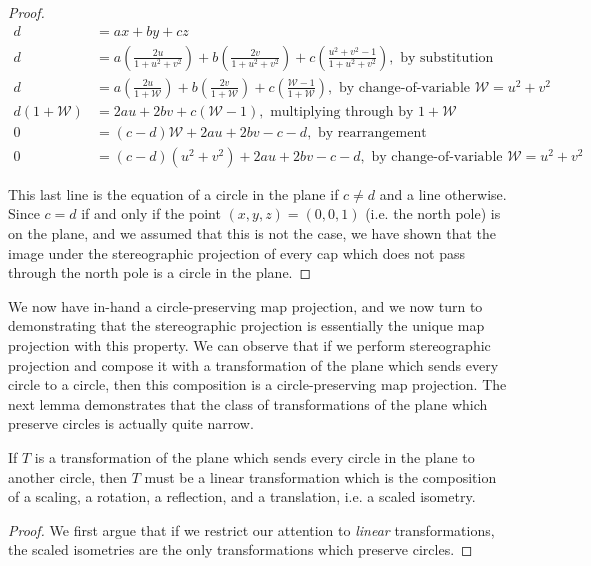 {\begin{proof}
\begin{align*}
    d&=ax+by+cz\\
    d&=a\left(\frac{2u}{1+u^2+v^2}\right)+b\left(\frac{2v}{1+u^2+v^2}\right)+c\left(\frac{u^2+v^2-1}{1+u^2+v^2}\right), \text{ by substitution}\\
    d&=a\left(\frac{2u}{1+\mathcal{W}}\right)+b\left(\frac{2v}{1+\mathcal{W}}\right)+c\left(\frac{\mathcal{W}-1}{1+\mathcal{W}}\right), \text{ by change-of-variable }\mathcal{W}=u^2+v^2\\
    d\left(1+\mathcal{W}\right)&=2au+2bv+c\left(\mathcal{W}-1\right), \text{ multiplying through by }1+\mathcal{W}\\
    0 &= (c-d)\mathcal{W} + 2au +2bv - c - d,\text{ by rearrangement}\\
    0 &= (c-d)(u^2+v^2)+2au+2bv - c - d,\text{ by change-of-variable } \mathcal{W}=u^2+v^2
\end{align*}

This last line is the equation of a circle in the plane if $c\neq d$ and a line otherwise.  Since $c=d$ if and only if the point $(x,y,z)=(0,0,1)$ (i.e. the north pole) is on the plane, and we assumed that this is not the case, we have shown that the image under the stereographic projection of every cap which does not pass through the north pole is a circle in the plane.

\end{proof}


We now have in-hand a circle-preserving map projection, and we now turn to demonstrating that the stereographic projection is essentially the unique map projection with this property.  We can observe that if we perform stereographic projection and compose it with a transformation of the plane which sends every circle to a circle, then this composition is a circle-preserving map projection.  The next lemma demonstrates that the class of transformations of the plane which preserve circles is actually quite narrow.

\begin{lemma}
If $T$ is a transformation of the plane which sends every circle in the plane to another circle, then $T$ must be a linear transformation which is the composition of a scaling, a rotation, a reflection, and a translation, i.e. a scaled isometry.
\end{lemma}
\begin{proof}

We first argue that if we restrict our attention to \textit{linear} transformations, the scaled isometries are the only transformations which preserve circles.  


\end{proof}}
